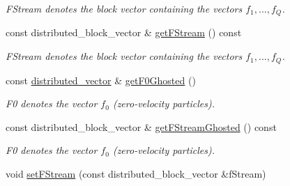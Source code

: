 \begin{DoxyCompactItemize}
\begin{DoxyCompactList}\small\item\em FStream denotes the block vector containing the vectors $ f_1, ..., f_Q $. \item\end{DoxyCompactList}\item 
\hypertarget{classnatrium_1_1DistributionFunctions_a88224d528262c522ea2ad8bec11178c1}{
const distributed\_\-block\_\-vector \& \hyperlink{classnatrium_1_1DistributionFunctions_a88224d528262c522ea2ad8bec11178c1}{getFStream} () const }
\label{classnatrium_1_1DistributionFunctions_a88224d528262c522ea2ad8bec11178c1}

\begin{DoxyCompactList}\small\item\em FStream denotes the block vector containing the vectors $ f_1, ..., f_Q $. \item\end{DoxyCompactList}\item 
\hypertarget{classnatrium_1_1DistributionFunctions_a79d29cb24887e83728fb2f94b611ecb8}{
const \hyperlink{namespacenatrium_a903d2b92917f582f2ff05f52160ab811}{distributed\_\-vector} \& \hyperlink{classnatrium_1_1DistributionFunctions_a79d29cb24887e83728fb2f94b611ecb8}{getF0Ghosted} ()}
\label{classnatrium_1_1DistributionFunctions_a79d29cb24887e83728fb2f94b611ecb8}

\begin{DoxyCompactList}\small\item\em F0 denotes the vector $ f_0 $ (zero-\/velocity particles). \item\end{DoxyCompactList}\item 
const distributed\_\-block\_\-vector \& \hyperlink{classnatrium_1_1DistributionFunctions_acc97fc1ac5185c94d8d15024c168b6c2}{getFStreamGhosted} () const 
\begin{DoxyCompactList}\small\item\em F0 denotes the vector $ f_0 $ (zero-\/velocity particles). \item\end{DoxyCompactList}\item 
\hypertarget{classnatrium_1_1DistributionFunctions_ad0ada0c54968a61f78eb1b82eb6c5a68}{
void \hyperlink{classnatrium_1_1DistributionFunctions_ad0ada0c54968a61f78eb1b82eb6c5a68}{setFStream} (const distributed\_\-block\_\-vector \&fStream)}
\label{classnatrium_1_1DistributionFunctions_ad0ada0c54968a61f78eb1b82eb6c5a68}


\end{DoxyCompactItemize}
